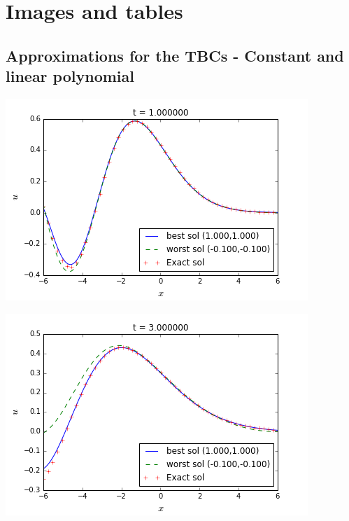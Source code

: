 \section{Images and tables}

\subsection{Approximations for the TBCs - Constant and linear polynomial}

\begin{minipage}{.5\linewidth}
	\includegraphics[scale=.5]{figures/firstTestsP0Snap2.png}
\end{minipage}
\begin{minipage}{.5\linewidth}
	\includegraphics[scale=.5]{figures/firstTestsP0Snap4.png}
\end{minipage}


